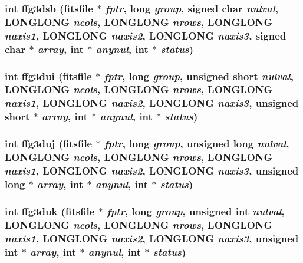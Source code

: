 \subsubsection{\setlength{\rightskip}{0pt plus 5cm}int ffg3dsb (\bf{fitsfile} $\ast$ {\em fptr}, long {\em group}, signed char {\em nulval}, \bf{LONGLONG} {\em ncols}, \bf{LONGLONG} {\em nrows}, \bf{LONGLONG} {\em naxis1}, \bf{LONGLONG} {\em naxis2}, \bf{LONGLONG} {\em naxis3}, signed char $\ast$ {\em array}, int $\ast$ {\em anynul}, int $\ast$ {\em status})}\label{fitsio_8h_b4a4f9b012ac8fb6d7291d5d6392b60a}


\subsubsection{\setlength{\rightskip}{0pt plus 5cm}int ffg3dui (\bf{fitsfile} $\ast$ {\em fptr}, long {\em group}, unsigned short {\em nulval}, \bf{LONGLONG} {\em ncols}, \bf{LONGLONG} {\em nrows}, \bf{LONGLONG} {\em naxis1}, \bf{LONGLONG} {\em naxis2}, \bf{LONGLONG} {\em naxis3}, unsigned short $\ast$ {\em array}, int $\ast$ {\em anynul}, int $\ast$ {\em status})}\label{fitsio_8h_c768e91e9d8cf7fd8e540a2a7e85deba}


\subsubsection{\setlength{\rightskip}{0pt plus 5cm}int ffg3duj (\bf{fitsfile} $\ast$ {\em fptr}, long {\em group}, unsigned long {\em nulval}, \bf{LONGLONG} {\em ncols}, \bf{LONGLONG} {\em nrows}, \bf{LONGLONG} {\em naxis1}, \bf{LONGLONG} {\em naxis2}, \bf{LONGLONG} {\em naxis3}, unsigned long $\ast$ {\em array}, int $\ast$ {\em anynul}, int $\ast$ {\em status})}\label{fitsio_8h_d886765b9948d84262f50cc8852df8f1}


\subsubsection{\setlength{\rightskip}{0pt plus 5cm}int ffg3duk (\bf{fitsfile} $\ast$ {\em fptr}, long {\em group}, unsigned int {\em nulval}, \bf{LONGLONG} {\em ncols}, \bf{LONGLONG} {\em nrows}, \bf{LONGLONG} {\em naxis1}, \bf{LONGLONG} {\em naxis2}, \bf{LONGLONG} {\em naxis3}, unsigned int $\ast$ {\em array}, int $\ast$ {\em anynul}, int $\ast$ {\em status})}\label{fitsio_8h_a9dabc5660546bef20f4e26cd7e63621}


